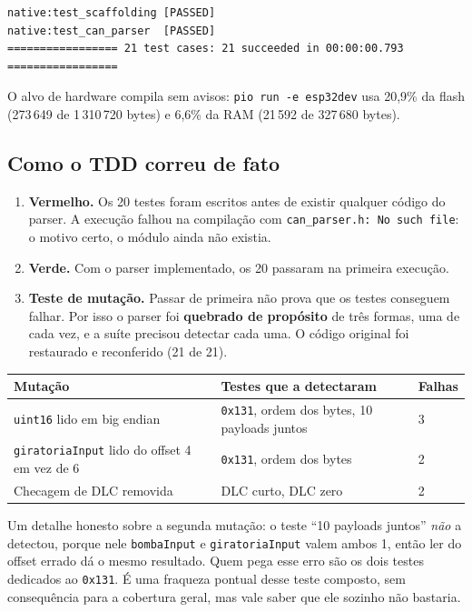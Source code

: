 \documentclass[11pt,a4paper]{article}
\begin{document}
\begin{lstlisting}[caption={Saída real de pio test -e native (resumo)}]
native:test_scaffolding [PASSED]
native:test_can_parser  [PASSED]
================= 21 test cases: 21 succeeded in 00:00:00.793 =================
\end{lstlisting}

O alvo de hardware compila sem avisos: \texttt{pio run -e esp32dev} usa 20,9\% da flash (273\,649 de 1\,310\,720 bytes) e 6,6\% da RAM (21\,592 de 327\,680 bytes).

\subsection{Como o TDD correu de fato}

\begin{enumerate}
    \item \textbf{Vermelho.} Os 20 testes foram escritos antes de existir qualquer código do parser. A execução falhou na compilação com \texttt{can\_parser.h: No such file}: o motivo certo, o módulo ainda não existia.
    \item \textbf{Verde.} Com o parser implementado, os 20 passaram na primeira execução.
    \item \textbf{Teste de mutação.} Passar de primeira não prova que os testes conseguem falhar. Por isso o parser foi \textbf{quebrado de propósito} de três formas, uma de cada vez, e a suíte precisou detectar cada uma. O código original foi restaurado e reconferido (21 de 21).
\end{enumerate}

\begin{center}
\begin{tabularx}{\textwidth}{lXl}
\toprule
\textbf{Mutação} & \textbf{Testes que a detectaram} & \textbf{Falhas} \\
\midrule
\texttt{uint16} lido em big endian & \texttt{0x131}, ordem dos bytes, 10 payloads juntos & 3 \\
\texttt{giratoriaInput} lido do offset 4 em vez de 6 & \texttt{0x131}, ordem dos bytes & 2 \\
Checagem de DLC removida & DLC curto, DLC zero & 2 \\
\bottomrule
\end{tabularx}
\end{center}

Um detalhe honesto sobre a segunda mutação: o teste ``10 payloads juntos'' \emph{não} a detectou, porque nele \texttt{bombaInput} e \texttt{giratoriaInput} valem ambos 1, então ler do offset errado dá o mesmo resultado. Quem pega esse erro são os dois testes dedicados ao \texttt{0x131}. É uma fraqueza pontual desse teste composto, sem consequência para a cobertura geral, mas vale saber que ele sozinho não bastaria.
\end{document}
